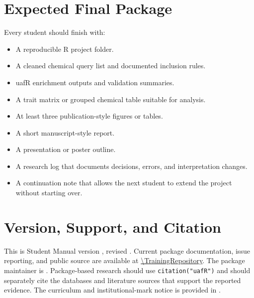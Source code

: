 \section*{Expected Final Package}
Every student should finish with:
\begin{itemize}
  \item A reproducible R project folder.
  \item A cleaned chemical query list and documented inclusion rules.
  \item uafR enrichment outputs and validation summaries.
  \item A trait matrix or grouped chemical table suitable for analysis.
  \item At least three publication-style figures or tables.
  \item A short manuscript-style report.
  \item A presentation or poster outline.
  \item A research log that documents decisions, errors, and interpretation changes.
  \item A continuation note that allows the next student to extend the project without starting over.
\end{itemize}

\section*{Version, Support, and Citation}
This is Student Manual version \TrainingVersion, revised
\TrainingRevisionDate. Current package documentation, issue reporting, and
public source are available at \url{\TrainingRepository}. The package
maintainer is \TrainingMaintainer. Package-based research should use
\texttt{citation("uafR")} and should separately cite the databases and
literature sources that support the reported evidence. The curriculum and
institutional-mark notice is provided in
.
